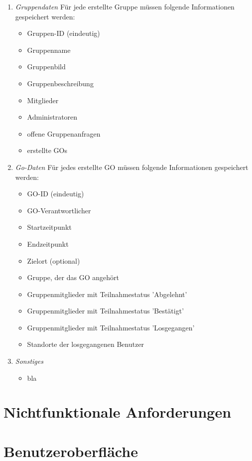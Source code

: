 \documentclass[parskip=full]{scrartcl}
\def\threedigits#1{%
  \ifnum#1<100 0\fi
  \ifnum#1<10 0\fi
  \number#1}
\begin{document}
\begin{enumerate}[label={\textbf{/D\protect\threedigits{\theenumi}0/}}, leftmargin=*]
	\item \textit{Gruppendaten} Für jede erstellte Gruppe müssen folgende Informationen gespeichert werden:
	\begin{itemize}
		\item Gruppen-ID (eindeutig)
		\item Gruppenname
		\item Gruppenbild
		\item Gruppenbeschreibung
		\item Mitglieder
		\item Administratoren
		\item offene Gruppenanfragen %
		\item erstellte GOs
	\end{itemize}
	\item \textit{Go-Daten} \label{GO-Daten}
	Für jedes erstellte GO müssen folgende Informationen gespeichert werden:
	\begin{itemize}
		\item GO-ID (eindeutig)
		\item GO-Verantwortlicher
		\item Startzeitpunkt
		\item Endzeitpunkt
		\item Zielort (optional)
		\item Gruppe, der das GO angehört
		\item Gruppenmitglieder mit Teilnahmestatus 'Abgelehnt'
		\item Gruppenmitglieder mit Teilnahmestatus 'Bestätigt'
		\item Gruppenmitglieder mit Teilnahmestatus 'Losgegangen'
		\item Standorte der losgegangenen Benutzer
	\end{itemize}
	\item \textit{Sonstiges}
		\begin{itemize}
			\item bla
		\end{itemize}
\end{enumerate}

\newpage
\section{Nichtfunktionale Anforderungen}

\newpage
\section{Benutzeroberfläche}
\end{document}
